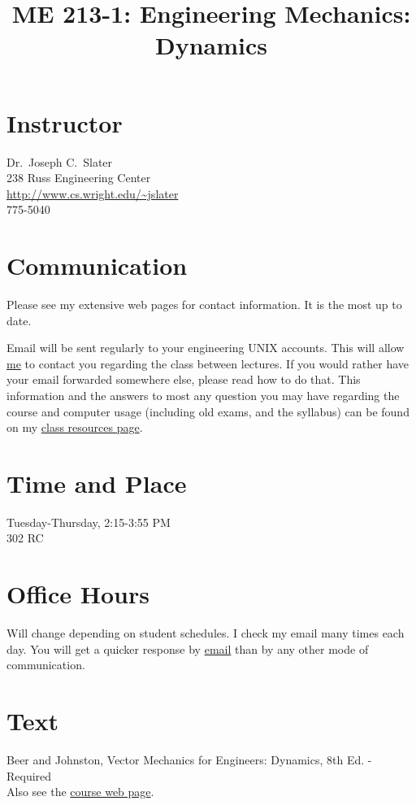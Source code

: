 \documentclass[10pt]{article}
\title{ME 213-1: Engineering Mechanics: Dynamics}
\author{}
\date{}
\begin{document}
\maketitle


\section*{Instructor}
Dr.~Joseph C.~Slater\\
238 Russ Engineering Center\\
\href{http://www.cs.wright.edu/~jslater}{\url{http://www.cs.wright.edu/~jslater}}\\
775-5040

\section*{Communication}
Please see my extensive web pages for contact information. It is the most up to date. 

\noindent Email will be sent regularly to your engineering UNIX accounts.  This will allow \href{http://www.cs.wright.edu/~jslater}{me} to contact you regarding the class between lectures.  If you would rather have your email forwarded somewhere else, please read how to do that.  This information and the answers to most any question you may have regarding the course and computer usage (including old exams, and the syllabus) can be found on my \href{http://www.cs.wright.edu/~jslater/syllabi.html}{class resources page}.

\section*{Time and Place}
Tuesday-Thursday, 2:15-3:55 PM\\
302 RC

\section*{Office Hours}
Will change depending on student schedules. %
I check my email many times each day. You will get a quicker response 
by \href{mailto:jslater@cs.wright.edu}{email} than by any other mode of communication.

\section*{Text}
Beer and Johnston, Vector Mechanics for Engineers: Dynamics, 8th Ed.
 - Required\\
Also see the \href{http://www.cs.wright.edu/~jslater/syllabi.html}{course web page}. 
\end{document}
